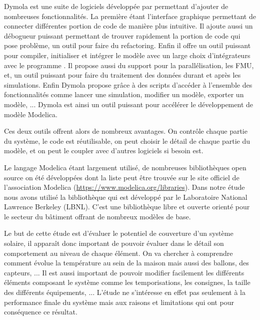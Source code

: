 Dymola est une suite de logiciels développée par 
permettant d’ajouter de nombreuses fonctionnalités.
La première étant l’interface graphique permettant de connecter différentes portion
de code de manière plus intuitive. Il ajoute aussi un débogueur puissant permettant
de trouver rapidement la portion de code qui pose problème, un outil pour faire du
refactoring. Enfin il offre un outil puissant pour compiler, initialiser et intégrer
le modèle avec un large choix d’intégrateurs avec le programme .
Il propose aussi du support pour la parallélisation, les FMU, et, un outil
puissant pour faire du traitement des données durant et après les simulations. Enfin
Dymola propose grâce à des scripts d’accéder à l’ensemble des fonctionnalités
comme lancer une simulation, modifier un modèle, exporter un modèle, ...
Dymola est ainsi un outil puissant pour accélérer le développement de modèle Modelica.


Ces deux outils offrent alors de nombreux avantages. On contrôle chaque partie
du système, le code est réutilisable, on peut choisir le détail de chaque partie
du modèle, et on peut le coupler avec d’autres logiciels si besoin est.

Le langage Modelica étant largement utilisé, de nombreuses bibliothèques open source
on été développées dont la liste peut être trouvée sur le site officiel de l’association Modelica
(\url{https://www.modelica.org/libraries}). Dans notre étude nous avons utilisé
la bibliothèque  qui est développé par le
Laboratoire National Lawrence Berkeley (LBNL). C’est une bibliothèque libre et ouverte
orienté pour le secteur du bâtiment offrant de nombreux modèles de base.


Le but de cette étude est d’évaluer le potentiel de couverture d’un système solaire,
il apparaît donc important de pouvoir évaluer dans le détail son comportement au niveau
de chaque élément. On va chercher à comprendre comment évolue la température au sein
de la maison mais aussi des ballons, des capteurs, ...
Il est aussi important de pouvoir modifier facilement les différents éléments composant
le système comme les temporisations, les consignes, la taille des différents équipements, ...
L’étude ne s’intéresse en effet pas seulement à la performance finale du système mais
aux raisons et limitations qui ont pour conséquence ce résultat.



